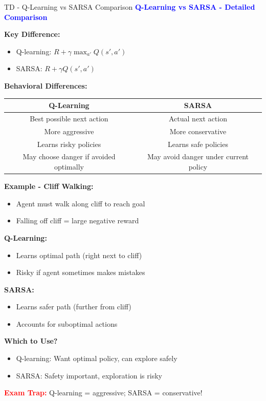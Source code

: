 \documentclass[8pt]{beamer}
\begin{document}
\begin{frame}{TD - Q-Learning vs SARSA Comparison}
\fontsize{6.5}{7.5}\selectfont
\textcolor{blue}{\textbf{Q-Learning vs SARSA - Detailed Comparison}}

\textbf{Key Difference:}
\begin{itemize}
\item Q-learning: $R + \gamma \max_{a'} Q(s',a')$
\item SARSA: $R + \gamma Q(s',a')$
\end{itemize}

\textbf{Behavioral Differences:}
\begin{tabular}{|c|c|}
\hline
Q-Learning & SARSA \\
\hline
Best possible next action & Actual next action \\
\hline
More aggressive & More conservative \\
\hline
Learns risky policies & Learns safe policies \\
\hline
May choose danger if avoided optimally & May avoid danger under current policy \\
\hline
\end{tabular}

\textbf{Example - Cliff Walking:}
\begin{itemize}
\item Agent must walk along cliff to reach goal
\item Falling off cliff = large negative reward
\end{itemize}

\textbf{Q-Learning:}
\begin{itemize}
\item Learns optimal path (right next to cliff)
\item Risky if agent sometimes makes mistakes
\end{itemize}

\textbf{SARSA:}
\begin{itemize}
\item Learns safer path (further from cliff)
\item Accounts for suboptimal actions
\end{itemize}

\textbf{Which to Use?}
\begin{itemize}
\item Q-learning: Want optimal policy, can explore safely
\item SARSA: Safety important, exploration is risky
\end{itemize}

\textcolor{red}{\textbf{Exam Trap:}} Q-learning = aggressive; SARSA = conservative!
\end{frame}
\end{document}
